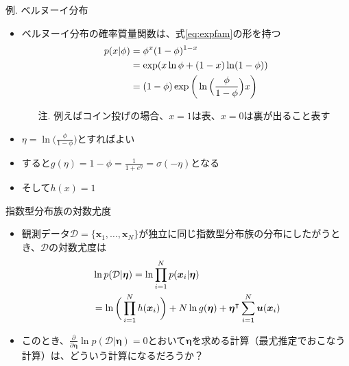 \documentclass[aspectratio=169,unicode,dvipdfmx,14pt]{beamer}
\begin{document}
\begin{frame}{例. ベルヌーイ分布}
\begin{itemize}
\item ベルヌーイ分布の確率質量関数は、式\eqref{eq:expfam}の形を持つ
\vspace{-.05in}
\begin{align}
p(x|\phi) & = \phi^x (1 - \phi)^{1 - x}
\notag \\ & = \exp( x\ln\phi + (1-x)\ln(1-\phi) )
\notag \\ & = (1 - \phi) \exp\bigg( \ln \Big( \frac{\phi}{1 - \phi} \Big) x \bigg)
\end{align}
\vspace{-.1in}
\begin{itemize}
\item[注.] 例えばコイン投げの場合、$x=1$は表、$x=0$は裏が出ること表す 
\end{itemize}
\item $\eta = \ln \Big( \frac{\phi}{1 - \phi} \Big)$とすればよい
\item すると$g(\eta) = 1 - \phi = \frac{1}{1 + e^\eta} = \sigma(- \eta)$となる
\item そして$h(x) = 1$
\end{itemize}
\end{frame}

\begin{frame}{指数型分布族の対数尤度}
\begin{itemize}
\item 観測データ$\mathcal{D} = \{ \bm{x}_1, \ldots, \bm{x}_N\}$が独立に同じ指数型分布族の分布にしたがうとき、$\mathcal{D}$の対数尤度は
\begin{align}
& \ln p(\mathcal{D}|\bm{\eta}) = \ln \prod_{i=1}^N p(\bm{x}_i|\bm{\eta}) 
\notag \\ &
= \ln \bigg( \prod_{i=1}^N h(\bm{x}_i) \bigg) + N \ln g(\bm{\eta}) 
+ \bm{\eta}^\intercal \sum_{i=1}^N \bm{u}(\bm{x}_i)
\end{align}
\item このとき、$\frac{\partial}{\partial \bm{\eta}} \ln p(\mathcal{D}|\bm{\eta}) = 0$とおいて$\bm{\eta}$を求める計算（最尤推定でおこなう計算）は、どういう計算になるだろうか？
\end{itemize}
\end{frame}
\end{document}
